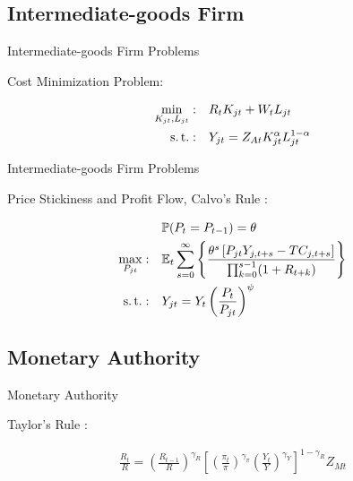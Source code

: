 \documentclass[../quali_slides.tex]{subfiles}
\begin{document}

\subsection{Intermediate-goods Firm}

	\begin{frame}{Intermediate-goods Firm Problems}
		
	Cost Minimization Problem:	
	
	\begin{align}
		\label{eq:int-good-firm-total-cost}
		\min_{K_{jt}, L_{jt}}: \quad & R_t K_{jt} + W_t L_{jt} \\
		\label{eq:int-good-firm-production-function}
		\operatorname{s.t.}: \quad & Y_{jt} = Z_{At} K_{jt}^\alpha L_{jt}^{1-\alpha}
	\end{align}	
				
	\end{frame}


\begin{frame}{Intermediate-goods Firm Problems}
	
	Price Stickiness and Profit Flow, Calvo's Rule \cite{calvo_staggered_1983}:
	
	\begin{align}
		& \quad \mathbb{P}(P_t=P_{t-1})=\theta \\
		\max_{P_{jt}}: & \quad \E \sum_{s=0}^{\infty} \left\{ \frac{ \theta^s \left[ P_{jt} Y_{j,t+s} - TC_{j,t+s} \right] }{\prod_{k=0}^{s-1}(1+R_{t+k})} \right\} \label{eq:int-good-firm-optimal-price-problem} \\
		\st: & \quad Y_{jt} = Y_t \left( \frac{P_t}{P_{jt}} \right)^{\psi} %
	\end{align}	
	
\end{frame}


\subsection{Monetary Authority}

\begin{frame}{Monetary Authority}
	
	Taylor's Rule \cite{taylor_discretion_1993}:
	
	\begin{align}
		\label{eq:monetary-policy}
		\frac{R_t}{R} =
		\left( \frac{R_{t-1}}{R} \right)^{\gamma_R}  \left[
		\left( \frac{\pi_t}{\pi} \right)^{\gamma_\pi}
		\left( \frac{Y_t}{Y} \right)^{\gamma_Y} \right]^{1-\gamma_R} Z_{Mt}
	\end{align}	
	
	
\end{frame}
\end{document}
